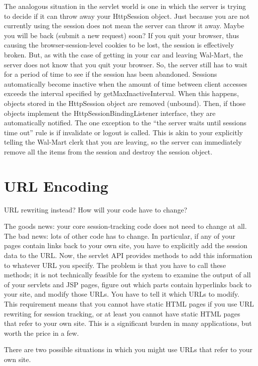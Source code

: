 \documentclass[a4paper,10pt]{scrreprt}
\begin{document}
{The analogous situation in the servlet world is one in which the server is trying to decide if it can throw away your
HttpSession object. Just because you are not currently using the session does not mean the server can throw it
away. Maybe you will be back (submit a new request) soon? If you quit your browser, thus causing the
browser-session-level cookies to be lost, the session is effectively broken. But, as with the case of getting in your 
car and
leaving Wal-Mart, the server does not know that you quit your browser. So, the server still has to wait for a period of
time to see if the session has been abandoned. Sessions automatically become inactive when the amount of time
between client accesses exceeds the interval specified by getMaxInactiveInterval. When this happens,
objects stored in the HttpSession object are removed (unbound). Then, if those objects implement the
HttpSessionBindingListener interface, they are automatically notified. The one exception to the “the
server waits until sessions time out” rule is if invalidate or logout is called. This is akin to your explicitly telling
the Wal-Mart clerk that you are leaving, so the server can immediately remove all the items from the session and
destroy the session object.


\section{URL Encoding}
URL rewriting instead? How will your code have to change?


The goods news: your core session-tracking code does not need to change at all.
The bad news: lots of other code has to change. In particular, if any of your pages contain links back to your own
site, you have to explicitly add the session data to the URL. Now, the servlet API provides methods to add this
information to whatever URL you specify. The problem is that you have to call these methods; it is not technically
feasible for the system to examine the output of all of your servlets and JSP pages, figure out which parts contain
hyperlinks back to your site, and modify those URLs. You have to tell it which URLs to modify. This requirement
means that you cannot have static HTML pages if you use URL rewriting for session tracking, or at least you cannot
have static HTML pages that refer to your own site. This is a significant burden in many applications, but worth the
price in a few.


There are two possible situations in which you might use URLs that refer to your own site.

}
\end{document}
